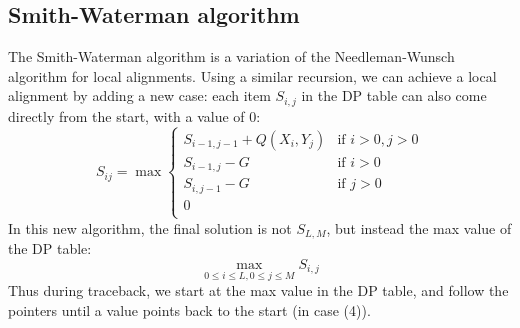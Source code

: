 \documentclass[12pt]{article}
\begin{document}
\subsection{Smith-Waterman algorithm}
The Smith-Waterman algorithm is a variation of the Needleman-Wunsch algorithm for local alignments. Using a similar recursion, we can achieve a local alignment by adding a new case: each item $S_{i,j}$ in the DP table can also come directly from the start, with a value of 0:
\begin{equation*}
S_{ij} = \max\begin{cases}
S_{i-1, j-1} + Q(X_i,Y_j) &\text{if }i>0, j>0\\
S_{i-1, j} - G &\text{if }i>0\\
S_{i, j-1} - G &\text{if }j>0\\
0 &\\
\end{cases}
\end{equation*}
In this new algorithm, the final solution is not $S_{L,M}$, but instead the max value of the DP table: $$\max_{0\leq i\leq L, 0\leq j\leq M} S_{i,j}$$
Thus during traceback, we start at the max value in the DP table, and follow the pointers until a value points back to the start (in case (4)).
\end{document}
